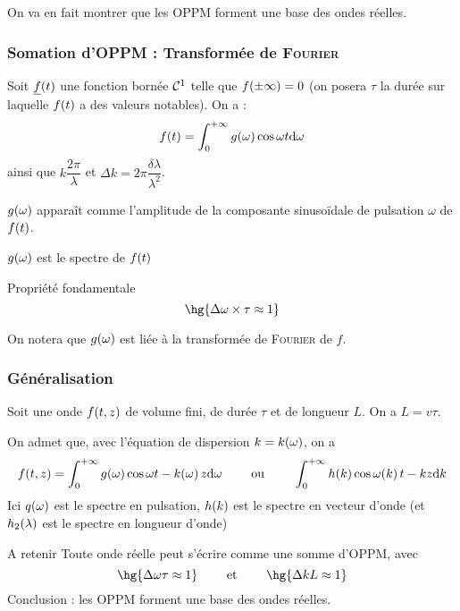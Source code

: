\documentclass[a4paper,french,bookmarks]{book}
\begin{document}
    On va en fait montrer que les OPPM forment une base des ondes réelles.
    
    \subsubsection*{Somation d'OPPM : Transformée de \textsc{Fourier}}
    
    Soit $\underline f\!\left(t\right)$ une fonction bornée $\mathcal{C}^1$ telle que $f\!\left(\pm \infty\right) = 0$ (on posera $\tau$ la durée sur laquelle $f\!\left(t\right)$ a des valeurs notables). On a :
    \[ f\!\left(t\right) = \int_0^{+\infty} g\!\left(\omega\right)\cos{\omega t}\mathrm d \omega\]
    ainsi que $k \dfrac{2\pi}{\lambda}$ et $\Delta k = 2\pi \dfrac{\delta \lambda}{\lambda^2}$.
    
    \begin{enumerate}
        \itt $g\!\left(\omega\right)$ apparaît comme l'amplitude de la composante sinusoïdale de pulsation $\omega$ de $f\!\left(t\right)$.
        
        \itt $g\!\left(\omega\right)$ est le spectre de $f\!\left(t\right)$
    \end{enumerate}
    
    \begin{property}{Propriété fondamentale}{}
        \[ \hg{\Delta \omega \times \tau \approx 1}\]
    \end{property}
    
    On notera que $g\!\left(\omega\right)$ est liée à la transformée de \textsc{Fourier} de $f$.
    
    \subsubsection*{Généralisation}
    
    Soit une onde $f\!\left(t, z\right)$ de volume fini, de durée $\tau$ et de longueur $L$. On a $L = v\tau$.
    
    On admet que, avec l'équation de dispersion $k = k\!\left(\omega\right)$, on a 
    \[ f\!\left(t, z\right) = \int_0^{+\infty} g\!\left(\omega\right)\cos{\omega t - k\!\left(\omega\right)z}\mathrm d \omega \qquad\ \text{ou} \ \qquad \int_0^{+\infty} h\!\left(k\right)\cos{\omega\!\left(k\right)t - kz}\mathrm d k\]
    Ici $q\!\left(\omega\right)$ est le spectre en pulsation, $h\!\left(k\right)$ est le spectre en vecteur d'onde (et $h_2\!\left(\lambda\right)$ est le spectre en longueur d'onde)
    
    \begin{form}{A retenir}
        Toute onde réelle peut s'écrire comme une somme d'OPPM, avec
        \[ \hg{\Delta \omega \tau \approx 1} \qquad\et\qquad \hg{\Delta k L \approx 1}\]
        Conclusion : les OPPM forment une base des ondes réelles.
    \end{form}
    
\end{document}
